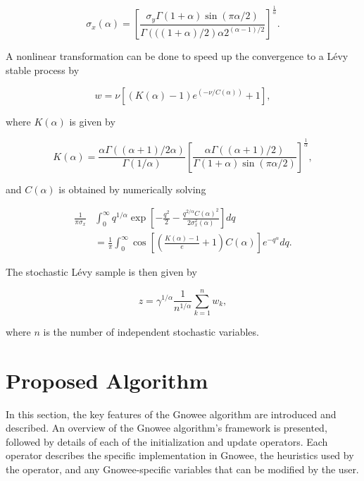\documentclass{article}                                                                           %
\begin{document}
\begin{equation}
  \sigma_x(\alpha)=\left[ \frac{\sigma_y \Gamma(1+\alpha)\sin(\pi \alpha/2)}{ \Gamma \left( ((1+\alpha)/2 \right)\alpha2^{(\alpha-1)/2}} \right]^{\frac{1}{\alpha}}.
\end{equation}  

\noindent A nonlinear transformation can be done to speed up the convergence to a Lévy stable process by

\begin{equation}
  w=\nu \left[ (K(\alpha)-1) e^{(-\nu/C(\alpha))}+1 \right],
\end{equation}

\noindent where $K(\alpha)$ is given by

\begin{equation}
  K(\alpha)= \frac{\alpha \Gamma((\alpha+1)/2\alpha)}{\Gamma(1/\alpha)} \left[ \frac{\alpha \Gamma((\alpha+1)/2)}{\Gamma(1+\alpha)\sin(\pi \alpha/2)} \right]^{\frac{1}{\alpha}},
\end{equation}   

\noindent and $C(\alpha)$ is obtained by numerically solving  

\begin{align}
  \frac{1}{\pi \sigma_x}&\int^{\infty}_0 q^{1/\alpha}\exp \left[-\frac{q^2}{2}-\frac{q^{2/\alpha}C(\alpha)^2}{2\sigma_x^2(\alpha)} \right] dq \nonumber \\ 
  &=\frac{1}{\pi} \int^{\infty}_0 \cos \left[ \left( \frac{K(\alpha)-1}{e}+1 \right)C(\alpha) \right] e^{-q^{\alpha}} dq.
\end{align}

\noindent The stochastic Lévy sample is then given by 

\begin{equation}  \label{eq:Levy_6}
  z=\gamma^{1/\alpha} \frac{1}{n^{1/\alpha}}\sum^n_{k=1}w_k,
\end{equation}

\noindent where $n$ is the number of independent stochastic variables. 
 
\section{Proposed Algorithm} \label{sec:algorithm}
In this section, the key features of the Gnowee algorithm are introduced and described. 
An overview of the Gnowee algorithm's framework is presented, followed by details of each of the initialization and update operators.
Each operator describes the specific implementation in Gnowee, the heuristics used by the operator, and any Gnowee-specific variables that can be modified by the user. 
\end{document}
